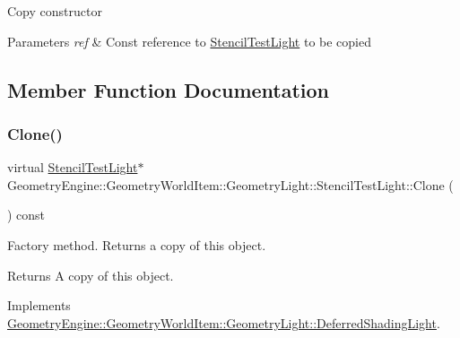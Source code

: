 Copy constructor 
\begin{DoxyParams}{Parameters}
{\em ref} & Const reference to \mbox{\hyperlink{class_geometry_engine_1_1_geometry_world_item_1_1_geometry_light_1_1_stencil_test_light}{Stencil\+Test\+Light}} to be copied \\
\hline
\end{DoxyParams}


\subsection{Member Function Documentation}
\mbox{\label{class_geometry_engine_1_1_geometry_world_item_1_1_geometry_light_1_1_stencil_test_light_a6434a228dc64537ff9984c82eaf8ab07}} 
\subsubsection{\texorpdfstring{Clone()}{Clone()}}
{\footnotesize\ttfamily virtual \mbox{\hyperlink{class_geometry_engine_1_1_geometry_world_item_1_1_geometry_light_1_1_stencil_test_light}{Stencil\+Test\+Light}}$\ast$ Geometry\+Engine\+::\+Geometry\+World\+Item\+::\+Geometry\+Light\+::\+Stencil\+Test\+Light\+::\+Clone (\begin{DoxyParamCaption}{ }\end{DoxyParamCaption}) const\hspace{0.3cm}{\ttfamily [pure virtual]}}

Factory method. Returns a copy of this object. \begin{DoxyReturn}{Returns}
A copy of this object. 
\end{DoxyReturn}


Implements \mbox{\hyperlink{class_geometry_engine_1_1_geometry_world_item_1_1_geometry_light_1_1_deferred_shading_light_a7ef4d7b7a41cbda01a55bcb0475484d3}{Geometry\+Engine\+::\+Geometry\+World\+Item\+::\+Geometry\+Light\+::\+Deferred\+Shading\+Light}}.



